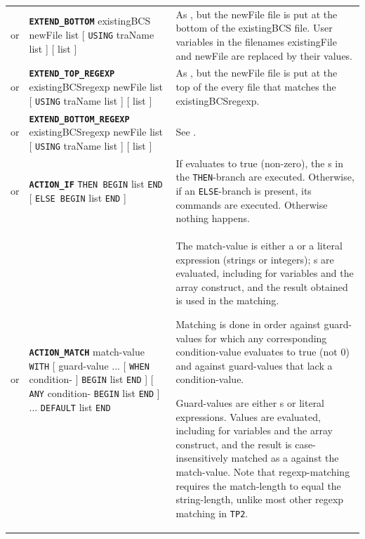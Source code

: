 \documentclass{article}
\def\ttref#1{\ahrefloc{#1}{\tt #1}}
\def\DEFINE#1{{\tt \bf #1}\label{#1}\index{#1}}
\def\t#1{{\tt #1}}
\def\Slist{{\color{red} list }}
\def\Ob{{\color{red} [ }}
\def\Oe{{\color{red} ] }}
\begin{document}
\begin{tabular}{cp{10in}|p{10in}}
  or & \t{\textbf{EXTEND_BOTTOM}}\index{EXTEND_BOTTOM (TP2)}
  \label{EXTEND_BOTTOM (TP2)} existingBCS newFile \ttref{patch}
  \Slist \Ob \t{USING} traName \Slist \Oe \Ob \ttref{when} \Slist \Oe &
    As \ttref{EXTEND_TOP (TP2)}, but the newFile file is put at the
    bottom of the existingBCS file. User variables in the filenames
    existingFile and newFile are replaced by their values. \\
  or & \DEFINE{EXTEND_TOP_REGEXP} existingBCSregexp newFile \ttref{patch} \Slist
    \Ob \t{USING} traName \Slist \Oe \Ob \ttref{when} \Slist \Oe &
    As \ttref{EXTEND_TOP (TP2)}, but the newFile file is put at the top of the
    every \ttref{BCS} file that matches the \ttref{regexp}
    existingBCSregexp. \\
  or & \DEFINE{EXTEND_BOTTOM_REGEXP} existingBCSregexp newFile
    \ttref{patch} \Slist \Ob \t{USING} traName \Slist \Oe
    \Ob \ttref{when} \Slist \Oe &
    See \ttref{EXTEND_TOP_REGEXP}.  \\
  or & \DEFINE{ACTION_IF} \ttref{value} \t{THEN BEGIN}
    \ttref{TP2 Action} \Slist \t{END}
    \Ob \t{ELSE BEGIN} \ttref{TP2 Action} \Slist \t{END} \Oe &
    If \ttref{value} evaluates to true (non-zero), the \ttref{TP2 Action}s
    in the \t{THEN}-branch are executed. Otherwise, if an \t{ELSE}-branch
    is present, its commands are executed. Otherwise nothing happens. \\

  or & \DEFINE{ACTION_MATCH} match-value \t{WITH} \Ob guard-value ...
    \Ob \t{WHEN} condition-\ttref{value} \Oe
    \t{BEGIN} \ttref{TP2 Action} \Slist \t{END} \Oe
    \Ob \t{ANY} condition-\ttref{value} \t{BEGIN} \ttref{TP2 Action}
    \Slist \t{END} \Oe ...
    \t{DEFAULT} \ttref{TP2 Action} \Slist \t{END} &

    The match-value is either a \ttref{value} or a literal expression
    (strings or integers); \ttref{value}s are evaluated, including for
    variables and the array construct, and the result obtained is used
    in the matching.

    Matching is done in order against guard-values for which any
    corresponding condition-value evaluates to true (not 0) and against
    guard-values that lack a condition-value.

    Guard-values are either \ttref{value}s or literal
    expressions. Values are evaluated, including for variables and the
    array construct, and the result is case-insensitively matched as a
    \ttref{regexp} against the match-value. Note that regexp-matching
    requires the match-length to equal the string-length, unlike most
    other regexp matching in \t{TP2}.


\end{tabular}
\end{document}
